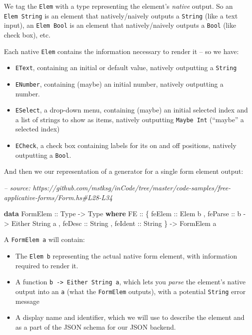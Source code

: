 \documentclass[]{article}
\newenvironment{Shaded}{}{}
\newcommand{\CommentTok}[1]{\textcolor[rgb]{0.38,0.63,0.69}{\textit{#1}}}
\newcommand{\DataTypeTok}[1]{\textcolor[rgb]{0.56,0.13,0.00}{#1}}
\newcommand{\KeywordTok}[1]{\textcolor[rgb]{0.00,0.44,0.13}{\textbf{#1}}}
\newcommand{\NormalTok}[1]{#1}
\newcommand{\OtherTok}[1]{\textcolor[rgb]{0.00,0.44,0.13}{#1}}
\begin{document}
We tag the \texttt{Elem} with a type representing the element's \emph{native}
output. So an \texttt{Elem\ String} is an element that natively/naively outputs
a \texttt{String} (like a text input), an \texttt{Elem\ Bool} is an element that
natively/naively outputs a \texttt{Bool} (like check box), etc.

Each native \texttt{Elem} contains the information necessary to render it -- so
we have:

\begin{itemize}
\tightlist
\item
  \texttt{EText}, containing an initial or default value, natively outputting a
  \texttt{String}
\item
  \texttt{ENumber}, containing (maybe) an initial number, natively outputting a
  number.
\item
  \texttt{ESelect}, a drop-down menu, containing (maybe) an initial selected
  index and a list of strings to show as items, natively outputting
  \texttt{Maybe\ Int} (``maybe'' a selected index)
\item
  \texttt{ECheck}, a check box containing labels for its on and off positions,
  natively outputting a \texttt{Bool}.
\end{itemize}

And then we our representation of a generator for a single form element output:

\begin{Shaded}
\begin{Highlighting}[]
\CommentTok{-- source: https://github.com/mstksg/inCode/tree/master/code-samples/free-applicative-forms/Form.hs#L28-L34}

\KeywordTok{data} \DataTypeTok{FormElem}\OtherTok{ ::} \DataTypeTok{Type} \OtherTok{->} \DataTypeTok{Type} \KeywordTok{where}
    \DataTypeTok{FE}\OtherTok{ ::}\NormalTok{ \{}\OtherTok{ feElem  ::} \DataTypeTok{Elem}\NormalTok{ b}
\NormalTok{          ,}\OtherTok{ feParse ::}\NormalTok{ b }\OtherTok{->} \DataTypeTok{Either} \DataTypeTok{String}\NormalTok{ a}
\NormalTok{          ,}\OtherTok{ feDesc  ::} \DataTypeTok{String}
\NormalTok{          ,}\OtherTok{ feIdent ::} \DataTypeTok{String}
\NormalTok{          \}}
        \OtherTok{->} \DataTypeTok{FormElem}\NormalTok{ a}
\end{Highlighting}
\end{Shaded}

A \texttt{FormElem\ a} will contain:

\begin{itemize}
\tightlist
\item
  The \texttt{Elem\ b} representing the actual native form element, with
  information required to render it.
\item
  A function \texttt{b\ -\textgreater{}\ Either\ String\ a}, which lets you
  \emph{parse} the element's native output into an \texttt{a} (what the
  \texttt{FormElem} outputs), with a potential \texttt{String} error message
\item
  A display name and identifier, which we will use to describe the element and
  as a part of the JSON schema for our JSON backend.
\end{itemize}
\end{document}
